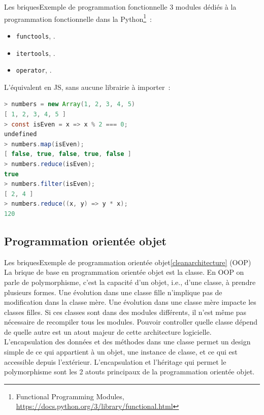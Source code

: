 \documentclass{beamer}
\begin{document}
    \begin{frame}[fragile]{Les briques}{Exemple de programmation fonctionnelle}
        3 modules dédiés à la programmation fonctionnelle dans la  Python\footnote{Functional Programming Modules, \url{https://docs.python.org/3/library/functional.html}}~:
        \begin{itemize}
            \item \lstinline{functools}, .
            \item \lstinline{itertools}, .
            \item \lstinline{operator}, .
        \end{itemize}
        L'équivalent en JS, sans aucune librairie à importer~:
        \begin{lstlisting}[language=java]
> numbers = new Array(1, 2, 3, 4, 5)
[ 1, 2, 3, 4, 5 ]
> const isEven = x => x % 2 === 0;
undefined
> numbers.map(isEven);
[ false, true, false, true, false ]
> numbers.reduce(isEven);
true
> numbers.filter(isEven);
[ 2, 4 ]
> numbers.reduce((x, y) => y * x);
120
        \end{lstlisting}
    \end{frame}

    \subsection{Programmation orientée objet}\label{subsec:briques-oop}
    \begin{frame}[fragile]{Les briques}{Exemple de programmation orientée objet\cref{cleanarchitecture}} (OOP)
        La brique de base en programmation orientée objet est la classe.
        \bigbreak
        En OOP on parle de polymorphisme, c'est la capacité d'un objet, i.e., d'une classe, à prendre plusieurs formes.
        Une évolution dans une classe fille n'implique pas de modification dans la classe mère.
        Une évolution dans une classe mère impacte les classes filles.
        Si ces classes sont dans des modules différents, il n'est même pas nécessaire de recompiler tous les modules.
        Pouvoir controller quelle classe dépend de quelle autre est un atout majeur de cette architecture logicielle.
        \bigbreak
        L'encapsulation des données et des méthodes dans une classe permet un design simple de ce qui appartient à un objet, une instance de classe, et ce qui est accessible depuis l'extérieur.
        \bigbreak
        L'encapsulation et l'héritage qui permet le polymorphisme sont les 2 atouts principaux de la programmation orientée objet.
    \end{frame}
\end{document}
